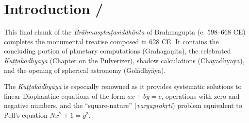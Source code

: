\documentclass[10pt,a4paper]{article}
\begin{document}



\section*{Introduction / }



\begin{minipage}[t]{0.47\textwidth}


\end{minipage}%

\hfill\vline\hfill%

\begin{minipage}[t]{0.47\textwidth}

This final chunk of the \textit{Brāhmasphuṭasiddhānta} of Brahmagupta (c. 598--668 CE) completes the monumental treatise composed in 628 CE. It contains the concluding portion of planetary computations (Grahagaṇita), the celebrated \textit{Kuṭṭakādhyāya} (Chapter on the Pulverizer), shadow calculations (Chāyādhyāya), and the opening of spherical astronomy (Golādhyāya).



The \textit{Kuṭṭakādhyāya} is especially renowned as it provides systematic solutions to linear Diophantine equations of the form $ax + by = c$, operations with zero and negative numbers, and the ``square-nature'' (\textit{vargaprakṛti}) problem equivalent to Pell's equation $Nx^2 + 1 = y^2$.

\end{minipage}



\vspace{1.5em}
\end{document}
